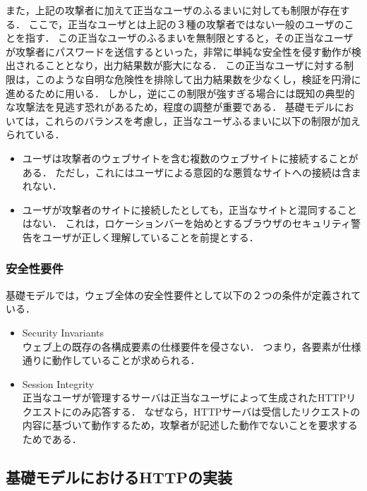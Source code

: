 \documentclass[12pt,a4paper]{jbook}
\begin{document}
また，上記の攻撃者に加えて正当なユーザのふるまいに対しても制限が存在する．
ここで，正当なユーザとは上記の３種の攻撃者ではない一般のユーザのことを指す．
この正当なユーザのふるまいを無制限とすると，その正当なユーザが攻撃者にパスワードを送信するといった，非常に単純な安全性を侵す動作が検出されることとなり，出力結果数が膨大になる．
この正当なユーザに対する制限は，このような自明な危険性を排除して出力結果数を少なくし，検証を円滑に進めるために用いる．
しかし，逆にこの制限が強すぎる場合には既知の典型的な攻撃法を見逃す恐れがあるため，程度の調整が重要である．
基礎モデルにおいては，これらのバランスを考慮し，正当なユーザふるまいに以下の制限が加えられている．
\begin{itemize}
\item ユーザは攻撃者のウェブサイトを含む複数のウェブサイトに接続することがある．
ただし，これにはユーザによる意図的な悪質なサイトへの接続は含まれない．
\item ユーザが攻撃者のサイトに接続したとしても，正当なサイトと混同することはない．
これは，ロケーションバーを始めとするブラウザのセキュリティ警告をユーザが正しく理解していることを前提とする．
\end{itemize}

\subsubsection{安全性要件}
基礎モデルでは，ウェブ全体の安全性要件として以下の２つの条件が定義されている．
\begin{itemize}
\item Security Invariants\\
ウェブ上の既存の各構成要素の仕様要件を侵さない．
つまり，各要素が仕様通りに動作していることが求められる．
\item Session Integrity\\
正当なユーザが管理するサーバは正当なユーザによって生成されたHTTPリクエストにのみ応答する．
なぜなら，HTTPサーバは受信したリクエストの内容に基づいて動作するため，攻撃者が記述した動作でないことを要求するためである．
\end{itemize}

\subsection{基礎モデルにおけるHTTPの実装}
\label{sec:based-model-http}
\end{document}
